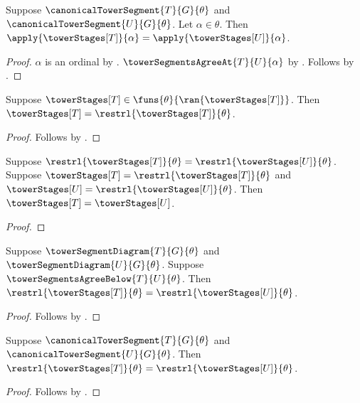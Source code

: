 \begin{proposition}\label{canonical_tower_stage_value_agreement}
    Suppose $\canonicalTowerSegment{T}{G}{\theta}$ and
        $\canonicalTowerSegment{U}{G}{\theta}$.
    Let $\alpha\in\theta$.
    Then $\apply{\towerStages[T]}{\alpha}=
        \apply{\towerStages[U]}{\alpha}$.
\end{proposition}
\begin{proof}
    $\alpha$ is an ordinal by
        .
    $\towerSegmentsAgreeAt{T}{U}{\alpha}$ by
        .
    Follows by
        .
\end{proof}

\begin{proposition}\label{tower_stage_family_full_restriction}
    Suppose $\towerStages[T]\in
        \funs{\theta}{\ran{\towerStages[T]}}$.
    Then $\towerStages[T]=\restrl{\towerStages[T]}{\theta}$.
\end{proposition}
\begin{proof}
    Follows by
        .
\end{proof}

\begin{proposition}\label{tower_stage_family_equality_from_restrictions}
    Suppose $\restrl{\towerStages[T]}{\theta}=
        \restrl{\towerStages[U]}{\theta}$.
    Suppose $\towerStages[T]=\restrl{\towerStages[T]}{\theta}$ and
        $\towerStages[U]=\restrl{\towerStages[U]}{\theta}$.
    Then $\towerStages[T]=\towerStages[U]$.
\end{proposition}
\begin{proof}
\end{proof}

\begin{proposition}\label{tower_agreement_full_stage_restrictions}
    Suppose $\towerSegmentDiagram{T}{G}{\theta}$ and
        $\towerSegmentDiagram{U}{G}{\theta}$.
    Suppose $\towerSegmentsAgreeBelow{T}{U}{\theta}$.
    Then $\restrl{\towerStages[T]}{\theta}=
        \restrl{\towerStages[U]}{\theta}$.
\end{proposition}
\begin{proof}
    Follows by
        .
\end{proof}

\begin{proposition}\label{canonical_tower_stage_restrictions_equal}
    Suppose $\canonicalTowerSegment{T}{G}{\theta}$ and
        $\canonicalTowerSegment{U}{G}{\theta}$.
    Then $\restrl{\towerStages[T]}{\theta}=
        \restrl{\towerStages[U]}{\theta}$.
\end{proposition}
\begin{proof}
    Follows by
        .
\end{proof}

